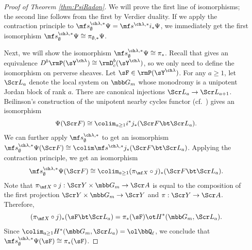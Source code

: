\begin{proof}[Proof of Theorem \ref{thm:PsiRadon}]
We will prove the first line of isomorphisms; the second line follows from the first
by Verdier duality.
If we apply the contraction principle to
$\mf s^{\ch\lambda,*}_\emptyset\Psi
= \mf s^{\ch\lambda,*} i_* \Psi$,
we immediately get the first isomorphism
$\mf s^{\ch\lambda,*}_\emptyset \Psi \cong \pi_{\emptyset,*}\Psi$.


Next, we will show the isomorphism $\mf s^{\ch\lambda,*}_\emptyset \Psi \cong \pi_*$.
Recall that \cite{Beilinson2} gives an equivalence
$D^b \rmP(\sY^{\ch\lambda}) \cong \rmD^b_c(\sY^{\ch\lambda})$,
so we only need to define the isomorphism on perverse sheaves.
Let $\sF \in \rmP(\sY^{\ch\lambda})$.
For any $a \ge 1$, let $\Scr L_a$ denote the local system on $\mbb G_m$
whose monodromy is a unipotent Jordan block of rank $a$. There are canonical
injections $\Scr L_a \to \Scr L_{a+1}$.
Beilinson's construction of the unipotent nearby cycles functor
(cf.~\cite[2.3]{Beilinson}) gives an isomorphism
\[ \Psi(\Scr F) \cong \colim_{a\ge 1} i^*j_*(\Scr F \bt \Scr L_a). \]
We can further apply $\mf s^{\ch\lambda,*}_\emptyset$ to get
an isomorphism $\mf s^{\ch\lambda,*}_\emptyset \Psi(\Scr F) \cong \colim \mf s^{\ch\lambda,*} j_*(\Scr F \bt \Scr L_a)$.
Applying the contraction principle, we get an isomorphism
\[ \mf s^{\ch\lambda,*}_\emptyset \Psi(\Scr F) \cong \colim_{a\ge 1}
(\pi_{\mf X} \circ j)_*(\Scr F \bt \Scr L_a). \]
Note that $\pi_{\mf X}\circ j : \Scr Y \times \mbb G_m \to \Scr A$
is equal to the composition of the first projection $\Scr Y\times \mbb G_m\to \Scr Y$
and $\pi:\Scr Y \to \Scr A$. Therefore,
\[ (\pi_{\mf X}\circ j)_* (\sF\bt \Scr L_a)
= \pi_*(\sF) \ot H^*(\mbb G_m, \Scr L_a). \]
Since $\colim_{a\ge 1} H^*(\mbb G_m, \Scr L_a) = \ol\bbQ_\ell$,
we conclude that $\mf s^{\ch\lambda,*}_\emptyset \Psi(\sF) \cong \pi_*(\sF)$.
\end{proof}
